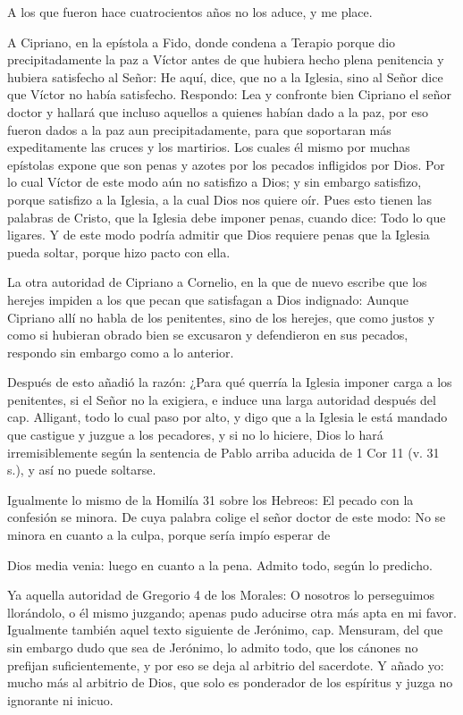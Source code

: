 A los que fueron hace cuatrocientos años no los aduce, y me place.

A Cipriano, en la epístola a Fido, donde condena a Terapio porque dio precipitadamente la paz a Víctor antes de que hubiera hecho plena penitencia y hubiera satisfecho al Señor: He aquí, dice, que no a la Iglesia, sino al Señor dice que Víctor no había satisfecho. Respondo: Lea y confronte bien Cipriano el señor doctor y hallará que incluso aquellos a quienes habían dado a la paz, por eso fueron dados a la paz aun precipitadamente, para que soportaran más expeditamente las cruces y los martirios. Los cuales él mismo por muchas epístolas expone que son penas y azotes por los pecados infligidos por Dios. Por lo cual Víctor de este modo aún no satisfizo a Dios; y sin embargo satisfizo, porque satisfizo a la Iglesia, a la cual Dios nos quiere oír. Pues esto tienen las palabras de Cristo, que la Iglesia debe imponer penas, cuando dice: Todo lo que ligares. Y de este modo podría admitir que Dios requiere penas que la Iglesia pueda soltar, porque hizo pacto con ella.

La otra autoridad de Cipriano a Cornelio, en la que de nuevo escribe que los herejes impiden a los que pecan que satisfagan a Dios indignado: Aunque Cipriano allí no habla de los penitentes, sino de los herejes, que como justos y como si hubieran obrado bien se excusaron y defendieron en sus pecados, respondo sin embargo como a lo anterior.

Después de esto añadió la razón: ¿Para qué querría la Iglesia imponer carga a los penitentes, si el Señor no la exigiera, e induce una larga autoridad después del cap. Alligant, todo lo cual paso por alto, y digo que a la Iglesia le está mandado que castigue y juzgue a los pecadores, y si no lo hiciere, Dios lo hará irremisiblemente según la sentencia de Pablo arriba aducida de 1 Cor 11 (v. 31 s.), y así no puede soltarse.

\marginpar{\small[378]} Igualmente lo mismo de la Homilía 31 sobre los Hebreos: El pecado con la confesión se minora. De cuya palabra colige el señor doctor de este modo: No se minora en cuanto a la culpa, porque sería impío esperar de

Dios media venia: luego en cuanto a la pena. Admito todo, según lo predicho.

Ya aquella autoridad de Gregorio 4 de los Morales: O nosotros lo perseguimos llorándolo, o él mismo juzgando; apenas pudo aducirse otra más apta en mi favor. Igualmente también aquel texto siguiente de Jerónimo, cap. Mensuram, del que sin embargo dudo que sea de Jerónimo, lo admito todo, que los cánones no prefijan suficientemente, y por eso se deja al arbitrio del sacerdote. Y añado yo: mucho más al arbitrio de Dios, que solo es ponderador de los espíritus y juzga no ignorante ni inicuo.

